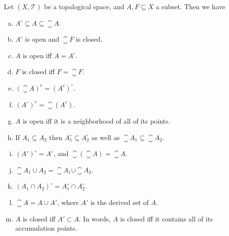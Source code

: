 \begin{proposition}
	Let $ (X,\mathcal{T}) $ be a topological space, and $ A,F \subseteq X $ a subset. Then we have
	\begin{enumerate}[(a)]
		\item $ A^\circ \subseteq A \subseteq \closure{A} $.
		\item $ A^\circ $ is open and $ \closure{F} $ is closed.
		\item $ A $ is open iff $ A = A^\circ $.
		\item $ F $ is closed iff $ F = \closure{F} $.
		\item $ (\closure{A})^c = (A^c)^\circ. $
		\item $ (A^\circ)^c = \closure{(A^c)} $.
		\item $ A $ is open iff it is a neighborhood of all of its points.
		\item If $ A_1 \subseteq A_2 $ then $ A_1^\circ \subseteq A_2^\circ $ as well as $ \closure{A_1} \subseteq \closure{A_2} $.
		\item $ (A^\circ)^\circ = A^\circ $, and $ \closure{(\closure{A})} = \closure{A} $.
		\item $ \closure{A_1\cup A_2} = \closure{A_1} \cup \closure{A_2} $.
		\item $ (A_1\cap A_2)^\circ = A_1^\circ \cap A_2^\circ $.
		\item $ \closure{A} = A \cup A' $, where $ A' $ is the derived set of $ A $.
		\item $ A $ is closed iff $ A' \subset A $. In words, $ A $ is closed iff it contains all of its accumulation points.
	\end{enumerate}
\end{proposition}
